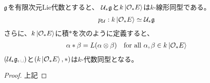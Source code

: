 {	\begin{proposition}[PBWの定理その二]\label{prop:PBWの定理その二} %
		${\mathfrak{g}}$を有限次元Lie代数とすると、
		${{\mathcal{U}}}_*{\mathfrak{g}}$と$k\mathinner{|{{\ensuremath{{\mathcal{O}}}}_*E}\rangle}$は$k$-線形同型である。
		\begin{equation*}\begin{split}
			p_{{\mathcal{U}}}: k\mathinner{|{{\ensuremath{{\mathcal{O}}}}_*E}\rangle} \simeq {\ensuremath{{\mathcal{U}}}}_*{\mathfrak{g}}
		\end{split}\end{equation*}
		さらに、$k\mathinner{|{{\ensuremath{{\mathcal{O}}}}_*E}\rangle}$に積$*$を次のように定義すると、
		\begin{equation*}\begin{split}
			\alpha*\beta = L(\alpha\otimes\beta)
			\quad\text{for all } \alpha,\beta\in k\mathinner{|{{\ensuremath{{\mathcal{O}}}}_*E}\rangle}
		\end{split}\end{equation*}
		$(\U_*\mf{g},\myspace)$と$(k\mathinner{|{{\ensuremath{{\mathcal{O}}}}_*E}\rangle},*)$は$k$-代数同型となる。
	\end{proposition} %
	\begin{proof} 上記
	\end{proof}
%
}\endgroup %
